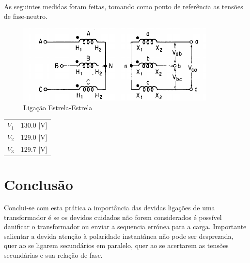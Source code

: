 \documentclass[paper=a4, fontsize=11pt]{article}
\begin{document}
As seguintes medidas foram feitas, tomando como ponto de referência as tensões de 
fase-neutro.

\begin{figure}[!ht]
    \centering
    \includegraphics[scale=.8]{estrela}
    \caption{Ligação Estrela-Estrela}
\end{figure}

\begin{center}
    \begin{tabular}{c||c}
        $V_1$ & 130.0 [V] \\
        $V_2$ & 129.0 [V] \\
        $V_3$ & 129.7 [V] \\
    \end{tabular}
\end{center}

\section{Conclusão}
Conclui-se com esta prática a importância das devidas ligações de uma transformador
é se os devidos cuidados não forem considerados é possível danificar o transformador
ou enviar a sequencia errónea para a carga. Importante salientar a devida atenção à
polaridade instantânea não pode ser desprezada, quer ao se ligarem secundários em 
paralelo, quer ao se acertarem as tensões secundárias e sua relação de fase.
\end{document}
